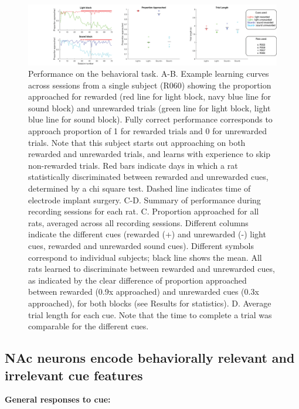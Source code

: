\documentclass[11pt]{article}
\begin{document}
\begin{figure}[h]
\centering
\includegraphics[width=\textwidth]{Fig 4 - Behavioral results.png}
\caption{Performance on the behavioral task. A-B. Example learning curves across sessions from a single subject (R060) showing the proportion approached for rewarded (red line for light block, navy blue line for sound block) and unrewarded trials (green line for light block, light blue line for sound block). Fully correct performance corresponds to approach proportion of 1 for rewarded trials and 0 for unrewarded trials. Note that this subject starts out approaching on both rewarded and unrewarded trials, and learns with experience to skip non-rewarded trials. Red bars indicate days in which a rat statistically discriminated between rewarded and unrewarded cues, determined by a chi square test. Dashed line indicates time of electrode implant surgery. C-D. Summary of performance during recording sessions for each rat. C. Proportion approached for all rats, averaged across all recording sessions. Different columns indicate the different cues (rewarded (+) and unrewarded (-) light cues, rewarded and unrewarded sound cues). Different symbols correspond to individual subjects; black line shows the mean. All rats learned to discriminate between rewarded and unrewarded cues, as indicated by the clear difference of proportion approached between rewarded (0.9x approached) and unrewarded cues (0.3x approached), for both blocks (see Results for statistics). D. Average trial length for each cue. Note that the time to complete a trial was comparable for the different cues.}
\label{fig:behav}
\end{figure}

\subsection*{NAc neurons encode behaviorally relevant and irrelevant cue features}

{\bf General responses to cue:}
\end{document}
